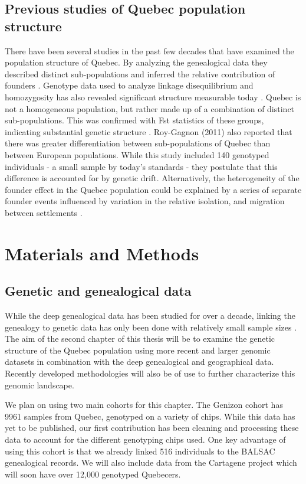 \documentclass[
11pt, %
oneside, %
english, %
doublespacing, %
headsepline, %
chapterinoneline, %
]{MastersDoctoralThesis} %
\begin{document}
\subsection{Previous studies of Quebec population structure}
There have been several studies in the past few decades that have examined the population structure of Quebec.
By analyzing the genealogical data they described distinct sub-populations and inferred the relative contribution of founders \citep{Gagnon2001, Bherer2011}.
Genotype data used to analyze linkage disequilibrium and homozygosity has also revealed significant structure measurable today \citep{ Roy-Gagnon2011}.
Quebec is not a homogeneous population, but rather made up of a combination of distinct sub-populations.
This was confirmed with Fst statistics of these groups, indicating substantial genetic structure \citep{Roy-Gagnon2011}.
Roy-Gagnon (2011) also reported that there was greater differentiation between sub-populations of Quebec than between European populations.
While this study included 140 genotyped individuals - a small sample by today's standards - they postulate that this difference is accounted for by genetic drift.
Alternatively, the heterogeneity of the founder effect in the Quebec population could be explained by a series of separate founder events influenced by variation in the relative isolation, and migration between settlements \citep{Gagnon2001,Laberge2005}.

\section{Materials and Methods}
\subsection{Genetic and genealogical data}
While the deep genealogical data has been studied for over a decade, linking the genealogy to genetic data has only been done with relatively small sample sizes \citep{Gagnon2001,Roy-Gagnon2011}.
The aim of the second chapter of this thesis will be to examine the genetic structure of the Quebec population using more recent and larger genomic datasets in combination with the deep genealogical and geographical data. 
Recently developed methodologies will also be of use to further characterize this genomic landscape.

We plan on using two main cohorts for this chapter. 
The Genizon cohort has 9961 samples from Quebec, genotyped on a variety of chips.
While this data has yet to be published, our first contribution has been cleaning and processing these data to account for the different genotyping chips used.
One key advantage of using this cohort is that we already linked 516 individuals to the BALSAC genealogical records.
We will also include data from the Cartagene project which will soon have over 12,000 genotyped Quebecers.
\end{document}

